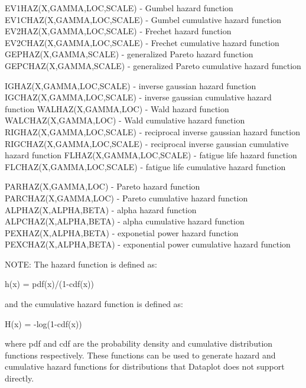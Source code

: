 {          EV1HAZ(X,GAMMA,LOC,SCALE)  - Gumbel hazard function
          EV1CHAZ(X,GAMMA,LOC,SCALE) - Gumbel cumulative hazard
                                       function
          EV2HAZ(X,GAMMA,LOC,SCALE)  - Frechet hazard function
          EV2CHAZ(X,GAMMA,LOC,SCALE) - Frechet cumulative hazard
                                       function
          GEPHAZ(X,GAMMA,SCALE)      - generalized Pareto hazard
                                       function
          GEPCHAZ(X,GAMMA,SCALE)     - generalized Pareto cumulative
                                       hazard function
   
          IGHAZ(X,GAMMA,LOC,SCALE)   - inverse gaussian hazard function
          IGCHAZ(X,GAMMA,LOC,SCALE)  - inverse gaussian cumulative
                                       hazard function
          WALHAZ(X,GAMMA,LOC)        - Wald hazard function
          WALCHAZ(X,GAMMA,LOC)       - Wald cumulative hazard function
          RIGHAZ(X,GAMMA,LOC,SCALE)  - reciprocal inverse gaussian
                                       hazard function
          RIGCHAZ(X,GAMMA,LOC,SCALE) - reciprocal inverse gaussian
                                       cumulative hazard function
          FLHAZ(X,GAMMA,LOC,SCALE)   - fatigue life hazard function
          FLCHAZ(X,GAMMA,LOC,SCALE)  - fatigue life cumulative hazard
                                       function
   
          PARHAZ(X,GAMMA,LOC)        - Pareto hazard function
          PARCHAZ(X,GAMMA,LOC)       - Pareto cumulative hazard
                                       function
          ALPHAZ(X,ALPHA,BETA)       - alpha hazard function
          ALPCHAZ(X,ALPHA,BETA)      - alpha cumulative hazard function
          PEXHAZ(X,ALPHA,BETA)       - exponetial power hazard function
          PEXCHAZ(X,ALPHA,BETA)      - exponential power cumulative
                                       hazard function
   
       NOTE: The hazard function is defined as:
   
                h(x) = pdf(x)/(1-cdf(x))
   
             and the cumulative hazard function is defined as:
   
                H(x) = -log(1-cdf(x))
   
             where pdf and cdf are the probability density and
             cumulative distribution functions respectively.  These
             functions can be used to generate hazard and cumulative
             hazard functions for distributions that Dataplot does
             not support directly.

}
